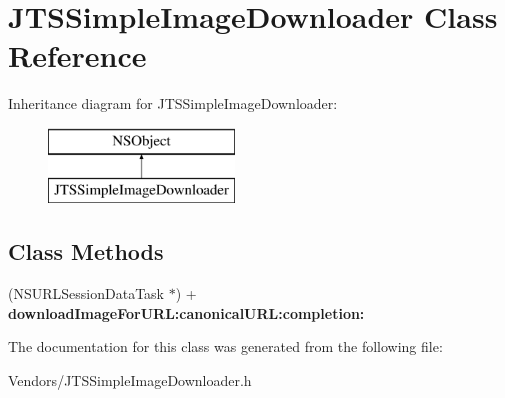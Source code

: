 \hypertarget{interface_j_t_s_simple_image_downloader}{}\section{J\+T\+S\+Simple\+Image\+Downloader Class Reference}
\label{interface_j_t_s_simple_image_downloader}
Inheritance diagram for J\+T\+S\+Simple\+Image\+Downloader\+:\begin{figure}[H]
\begin{center}
\leavevmode
\includegraphics[height=2.000000cm]{interface_j_t_s_simple_image_downloader}
\end{center}
\end{figure}
\subsection*{Class Methods}
\begin{DoxyCompactItemize}
\item 
\hypertarget{interface_j_t_s_simple_image_downloader_a70df9b8745fdcca662854494d4c08521}{}(N\+S\+U\+R\+L\+Session\+Data\+Task $\ast$) + {\bfseries download\+Image\+For\+U\+R\+L\+:canonical\+U\+R\+L\+:completion\+:}\label{interface_j_t_s_simple_image_downloader_a70df9b8745fdcca662854494d4c08521}

\end{DoxyCompactItemize}


The documentation for this class was generated from the following file\+:\begin{DoxyCompactItemize}
\item 
Vendors/J\+T\+S\+Simple\+Image\+Downloader.\+h\end{DoxyCompactItemize}
